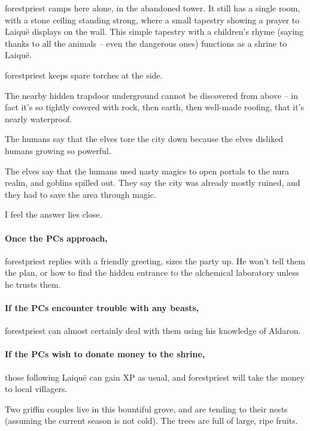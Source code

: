 \begin{multicols}{2}
\Gls{forestpriest} camps here alone, in the abandoned tower.
It still has a single room, with a stone ceiling standing strong, where a small tapestry showing a prayer to Laiqu\"e displays on the wall.
This simple tapestry with a children's rhyme (saying thanks to all the animals -- even the dangerous ones) functions as a shrine to Laiqu\"e.

\Gls{forestpriest} keeps spare torches at the side.

The nearby hidden trapdoor underground cannot be discovered from above -- in fact it's so tightly covered with rock, then earth, then well-made roofing, that it's nearly waterproof.

\begin{speechtext}

  The humans say that the elves tore the city down because the elves disliked humans growing so powerful.

  The elves say that the humans used nasty magics to open portals to the nura realm, and goblins spilled out.
  They say the city was already mostly ruined, and they had to save the area through magic.

  I feel the answer lies close.

\end{speechtext}

\paragraph{Once the PCs approach,}
\gls{forestpriest} replies with a friendly greeting, sizes the party up.
He won't tell them the plan, or how to find the hidden entrance to the alchemical laboratory unless he trusts them.

\paragraph{If the PCs encounter trouble with any beasts,}
\gls{forestpriest} can almost certainly deal with them using his knowledge of Aldaron.

\paragraph{If the PCs wish to donate money to the shrine,}
those following Laiqu\"e can gain XP as usual, and \gls{forestpriest} will take the money to local villagers.


Two griffin couples live in this bountiful grove, and are tending to their nests (assuming the current season is not cold).
The trees are full of large, ripe fruits.


\end{multicols}
